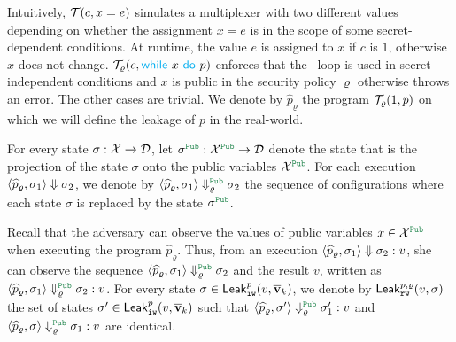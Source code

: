Intuitively, %
$\mathcal{T}(c,x = e)$ simulates a multiplexer with two different values
depending on whether the assignment $x = e$ is in the scope of some secret-dependent conditions.
At runtime, the value $e$ is assigned to $x$ if $c$ is $1$, otherwise $x$ does not change.
$\mathcal{T}_\varrho(c,{{\textcolor{cyan}{\sf while}}} \ x \ {\textcolor{cyan}{\sf do}}\ p)$ enforces that the {\Pwhile}\ loop is used in secret-independent conditions
and $x$ is public in the security policy $\varrho$ otherwise throws an error.
The other cases are trivial.
We denote by $\widehat{p}_\varrho$ the program $\mathcal{T}_\varrho(1,p)$ on which
we will define the leakage of $p$ in the real-world.



For every state $\sigma: \mathcal{X}\rightarrow \mathcal{D}$,
let $\sigma^{\Pub}:\Var^{\Pub}\rightarrow\Rng$ denote the
state that is the projection of the state $\sigma$ onto the public variables $\Var^{\Pub}$.
For each execution $\langle{\widehat{p}_\varrho, \sigma_1}\rangle\Downarrow \sigma_2$,  we denote
by $\MPCAngle{\widehat{p}_\varrho,\sigma_1}\Downarrow_\varrho^{\Pub} \sigma_2$ the sequence
of configurations where each state $\sigma$ %
is replaced by the state $\sigma^{\Pub}$.

Recall that the adversary can observe the values of public variables $x\in \Var^{\Pub}$
when executing the program $\widehat{p}_\varrho$. %
Thus, from an execution $\langle{\widehat{p}_\varrho,\sigma_1}\rangle\Downarrow\sigma_2:v$,
she can observe the sequence $\MPCAngle{\widehat{p}_\varrho,\sigma_1}\Downarrow_\varrho^{\Pub} \sigma_2$ and the result $v$, written as $\MPCAngle{\widehat{p}_\varrho,\sigma_1}\Downarrow_\varrho^{\Pub} \sigma_2:v$.
%
%
For every state $\sigma\in{\sf Leak}_{\tt iw}^p(v,\overline{\bf{v}}_k)$,
we denote by ${\sf Leak}_{\tt rw}^{p,\varrho}(v,\sigma)$
the set of states $\sigma'\in{\sf Leak}_{\tt iw}^p(v,\overline{\bf{v}}_k)$ such that
$\MPCAngle{\widehat{p}_\varrho,\sigma'}\Downarrow_\varrho^{\Pub} \sigma_1':v$
and $\MPCAngle{\widehat{p}_\varrho,\sigma}\Downarrow_\varrho^{\Pub} \sigma_1:v$ are identical.



